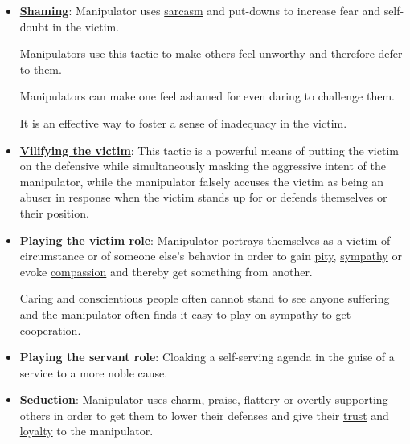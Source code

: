 \documentclass{book}
\numberwithin{equation}{section}
\begin{document}
\begin{itemize}
    A manipulator suggests to the \href{https://en.wikipedia.org/wiki/Conscientious}{conscientious} victim that they do not care enough, are too selfish or have it too easy.
    
    This can result in the victim feeling bad, keeping them in a \href{https://en.wikipedia.org/wiki/Doubt}{self-doubting}, \href{https://en.wikipedia.org/wiki/Anxious}{anxious} and \href{https://en.wikipedia.org/wiki/Submissive}{submissive} position.
    \item \href{https://en.wikipedia.org/wiki/Shaming}{\textbf{Shaming}}: Manipulator uses \href{https://en.wikipedia.org/wiki/Sarcasm}{sarcasm} and put-downs to increase fear and self-doubt in the victim.
    
    Manipulators use this tactic to make others feel unworthy and therefore defer to them.
    
    Manipulators can make one feel ashamed for even daring to challenge them.
    
    It is an effective way to foster a sense of inadequacy in the victim.
    \item \href{https://en.wikipedia.org/wiki/Victim_blaming}{\textbf{Vilifying the victim}}: This tactic is a powerful means of putting the victim on the defensive while simultaneously masking the aggressive intent of the manipulator, while the manipulator falsely accuses the victim as being an abuser in response when the victim stands up for or defends themselves or their position.
    \item \textbf{\href{https://en.wikipedia.org/wiki/Victim_playing}{Playing the victim} role}: Manipulator portrays themselves as a victim of circumstance or of someone else's behavior in order to gain \href{https://en.wikipedia.org/wiki/Pity}{pity}, \href{https://en.wikipedia.org/wiki/Sympathy}{sympathy} or evoke \href{https://en.wikipedia.org/wiki/Compassion}{compassion} and thereby get something from another.
    
    Caring and conscientious people often cannot stand to see anyone suffering and the manipulator often finds it easy to play on sympathy to get cooperation.
    \item \textbf{Playing the servant role}: Cloaking a self-serving agenda in the guise of a service to a more noble cause.
    \item \href{https://en.wikipedia.org/wiki/Seduction}{\textbf{Seduction}}: Manipulator uses \href{https://en.wikipedia.org/wiki/Superficial_charm}{charm}, praise, flattery or overtly supporting others in order to get them to lower their defenses and give their \href{https://en.wikipedia.org/wiki/Trust_(social_sciences)}{trust} and \href{https://en.wikipedia.org/wiki/Loyalty}{loyalty} to the manipulator.
    

\end{itemize}
\end{document}
